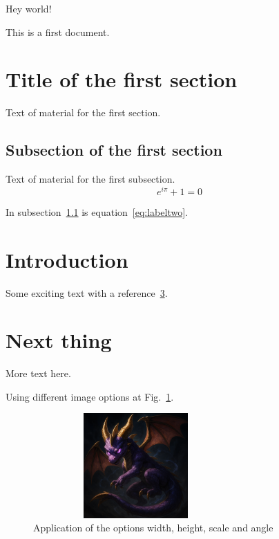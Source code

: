 \documentclass{article}
\begin{document}

Hey world!

This is a first document.

\section{Title of the first section}

Text of material for the first section.

\subsection{Subsection of the first section}
\label{subsec:labelone}

Text of material for the first subsection.
\begin{equation}
e^{i\pi}+1 = 0
\label{eq:labeltwo}
\end{equation}

In subsection~\ref{subsec:labelone} is equation~\ref{eq:labeltwo}.


\section{Introduction}

Some exciting text with a reference~\ref{sec:next}.

\section{Next thing}
\label{sec:next}

More text here. \lipsum[1]


Using different image options at Fig.~\ref{fig:my_image}.
\begin{figure}[H]
    \centering
    \includegraphics[width=0.7\textwidth,
                     height=4cm,
                     scale=0.8,
                     angle=15]
                     {example-image_b.png}
    \caption{Application of the options width, height, scale and angle}
    \label{fig:my_image}
\end{figure}
\end{document}
